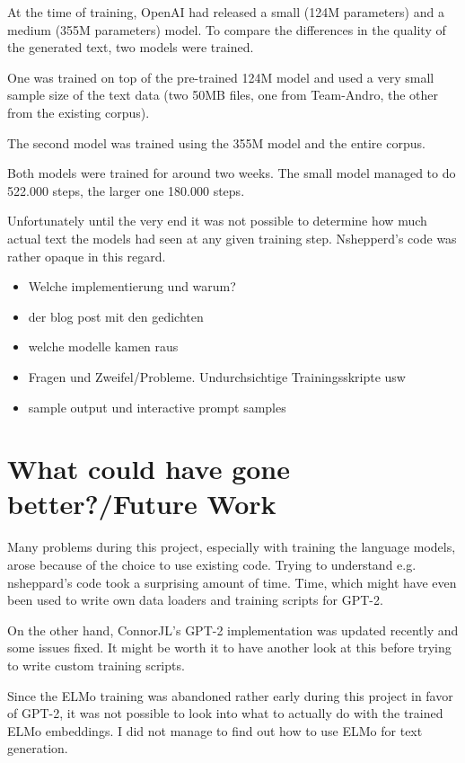 \documentclass[sigconf,natbib=false]{acmart}
\begin{document}
At the time of training, OpenAI had released a small (124M parameters) and a medium (355M parameters) model. To compare the differences in the quality of the generated text, two models were trained.

One was trained on top of the pre-trained 124M model and used a very small sample size of the text data (two 50MB files, one from Team-Andro, the other from the existing corpus).

The second model was trained using the 355M model and the entire corpus. 

Both models were trained for around two weeks. The small model managed to do 522.000 steps, the larger one 180.000 steps.


Unfortunately until the very end it was not possible to determine how much actual text the models had seen at any given training step. Nshepperd's code was rather opaque in this regard.


\begin{itemize}
	\item Welche implementierung und warum?
	\item der blog post mit den gedichten
	\item welche modelle kamen raus
	\item Fragen und Zweifel/Probleme. Undurchsichtige Trainingsskripte usw
	\item sample output und interactive prompt samples
\end{itemize}



\section{What could have gone better?/Future Work}
\label{sec:FW}
Many problems during this project, especially with training the language models, arose because of the choice to use existing code. Trying to understand e.g. nsheppard's code took a surprising amount of time. Time, which might have even been used to write own data loaders and training scripts for GPT-2.

On the other hand, ConnorJL's GPT-2 implementation was updated recently and some issues fixed. It might be worth it to have another look at this before trying to write custom training scripts.

Since the ELMo training was abandoned rather early during this project in favor of GPT-2, it was not possible to look into what to actually do with the trained ELMo embeddings. I did not manage to find out how to use ELMo for text generation.




 
%
%
%

\printbibliography
\end{document}
